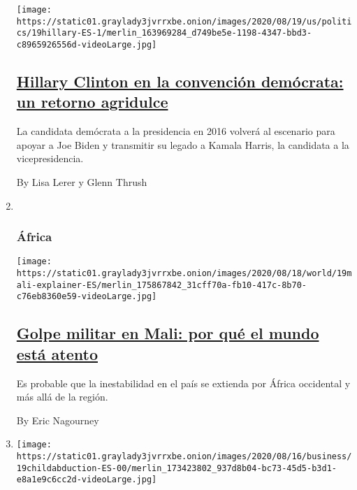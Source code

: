 \begin{enumerate}
  \texttt{[image: https://static01.graylady3jvrrxbe.onion/images/2020/08/19/us/politics/19hillary-ES-1/merlin\_163969284\_d749be5e-1198-4347-bbd3-c8965926556d-videoLarge.jpg]}

  \hypertarget{hillary-clinton-en-la-convenciuxf3n-demuxf3crata-un-retorno-agridulce}{%
  \subsection{\texorpdfstring{\href{/es/2020/08/19/espanol/estados-unidos/hillary-clinton-convencion.html}{Hillary
  Clinton en la convención demócrata: un retorno
  agridulce}}{Hillary Clinton en la convención demócrata: un retorno agridulce}}\label{hillary-clinton-en-la-convenciuxf3n-demuxf3crata-un-retorno-agridulce}}

  La candidata demócrata a la presidencia en 2016 volverá al escenario
  para apoyar a Joe Biden y transmitir su legado a Kamala Harris, la
  candidata a la vicepresidencia.

  By Lisa Lerer y Glenn Thrush
\item ~
  \hypertarget{uxe1frica}{%
  \subsubsection{África}\label{uxe1frica}}

  \texttt{[image: https://static01.graylady3jvrrxbe.onion/images/2020/08/18/world/19mali-explainer-ES/merlin\_175867842\_31cff70a-fb10-417c-8b70-c76eb8360e59-videoLarge.jpg]}

  \hypertarget{golpe-militar-en-mali-por-quuxe9-el-mundo-estuxe1-atento}{%
  \subsection{\texorpdfstring{\href{/es/2020/08/19/espanol/mundo/mali-golpe-militar.html}{Golpe
  militar en Mali: por qué el mundo está
  atento}}{Golpe militar en Mali: por qué el mundo está atento}}\label{golpe-militar-en-mali-por-quuxe9-el-mundo-estuxe1-atento}}

  Es probable que la inestabilidad en el país se extienda por África
  occidental y más allá de la región.

  By Eric Nagourney
\item
  \texttt{[image: https://static01.graylady3jvrrxbe.onion/images/2020/08/16/business/19childabduction-ES-00/merlin\_173423802\_937d8b04-bc73-45d5-b3d1-e8a1e9c6cc2d-videoLarge.jpg]}

  \hypertarget{tres-veces-secuestrada-asuxed-funciona-el-negocio-de-los-raptos-corporativos}{%
}
\end{enumerate}
